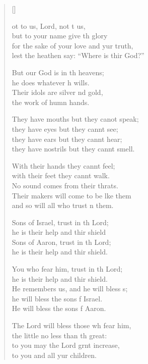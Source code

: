 \settowidth{\versewidth}{for the sake of your love and your truth, *}
\begin{verse}[\versewidth]
  \begin{patverse}
ot to us, Lord, not t us,\Med\\
but to your name give th glory\\
for the sake of your love and yur truth,\Med\\
lest the heathen say: “Where is thir God?”

But our God is in th heavens;\Med\\
he does whatever h wills.\\
Their idols are silver nd gold,\Med\\
the work of humn hands.

They have mouths but they canot speak;\Med\\
they have eyes but they cannt see;\\
they have ears but they cannt hear;\Med\\
they have nostrils but they cannt smell.

With their hands they cannt feel;\Flex\\
with their feet they cannt walk.\Med\\
No sound comes from their thrats.\\
Their makers will come to be l\pointup{\i}ke them\Med\\
and so will all who trust \pointup{\i}n them.

Sons of Israel, trust in th Lord;\Med\\
he is their help and thir shield\\
Sons of Aaron, trust in th Lord;\Med\\
he is their help and thir shield.

You who fear him, trust in th Lord;\Med\\
he is their help and thir shield.\\
He remembers us, and he will bless s;\Flex\\
he will bless the sons f Israel.\Med\\
He will bless the sons f Aaron.

The Lord will bless those wh fear him,\Med\\
the little no less than th great:\\
to you may the Lord grnt increase,\Med\\
to you and all yur children.


\end{patverse}
\end{verse}

